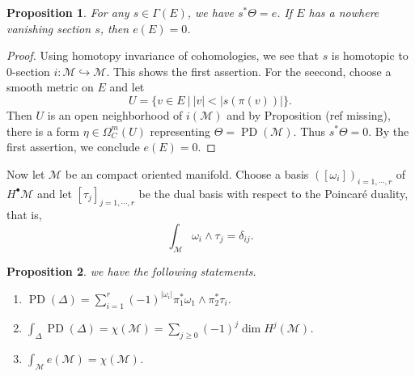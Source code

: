 \documentclass[8pt]{article}
\newtheorem{proposition}{Proposition}[section]
\DeclareMathOperator{\PD}{PD}
\newcommand{\M}[0]{\mathcal{M}}
\newcommand{\sep}[0]{\:|\:}
\begin{document}
\begin{proposition}
  For any $s\in\Gamma(E)$, we have $s^*\Theta=e$. If $E$ has a nowhere vanishing section $s$, then $e(E)=0$.
\end{proposition}
\begin{proof}
  Using homotopy invariance of cohomologies, we see that $s$ is homotopic to $0$-section $i:\M\hookrightarrow\M$. This shows the first assertion. For the seecond, choose a smooth metric on $E$ and let 
  \begin{equation*}
    U=\{v\in E\sep \vert v\vert<\vert s(\pi(v))\vert\}.
  \end{equation*} 
  Then $U$ is an open neighborhood of $i(\M)$ and by Proposition (ref missing), there is a form $\eta\in\Omega_C^m(U)$ representing $\Theta=\PD(\M)$. Thus $s^*\Theta=0$. By the first assertion, we conclude $e(E)=0$.
\end{proof}
Now let $\M$ be an compact oriented manifold. Choose a basis $([\omega_i])_{i=1,\cdots,r}$ of $H^\bullet\M$ and let $[\tau_j]_{j=1,\cdots,r}$ be the dual basis with respect to the Poincaré duality, that is,
\begin{equation*}
  \int_\M \omega_i\wedge\tau_j = \delta_{ij}.
\end{equation*}
\begin{proposition}
  we have the following statements.
  \begin{enumerate}[1).]
    \item $\PD(\Delta)=\sum_{i=1}^r(-1)^{\vert\omega_i\vert}\pi_1^*\omega_1\wedge\pi_2^*\tau_i$.
    \item $\int_\Delta\PD(\Delta) = \chi(\M) = \sum_{j\geq0}(-1)^j\dim H^j(\M)$.
    \item $\int_\M e(\M)=\chi(\M)$.
  \end{enumerate}
\end{proposition}
\end{document}
